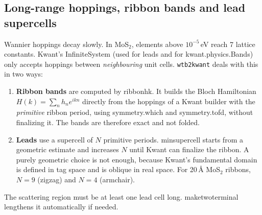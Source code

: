 \documentclass[11pt,a4paper]{article}
\newcommand{\code}[1]{{\ttfamily\def\_{\textunderscore\allowbreak}\def\slash{/\allowbreak}#1}}
\newcommand{\tool}{\texttt{wtb2kwant}}
\begin{document}
\subsection{Long-range hoppings, ribbon bands and lead supercells}
Wannier hoppings decay slowly. In MoS$_2$, elements above $10^{-5}$\,eV reach 7 lattice
constants. Kwant's \code{InfiniteSystem} (used for leads and for \code{kwant.physics.Bands})
only accepts hoppings between \emph{neighbouring} unit cells. \tool{} deals with this in
two ways:
\begin{enumerate}[nosep]
  \item \textbf{Ribbon bands} are computed by \code{ribbon\_hk}. It builds the Bloch
        Hamiltonian $H(k)=\sum_n h_n e^{ikn}$ directly from the hoppings of a Kwant builder
        with the \emph{primitive} ribbon period, using \code{symmetry.which} and
        \code{symmetry.to\_fd}, without finalizing it. The bands are therefore exact and
        not folded.
  \item \textbf{Leads} use a supercell of $N$ primitive periods. \code{min\_supercell}
        starts from a geometric estimate and increases $N$ until Kwant can finalize the
        ribbon. A purely geometric choice is not enough, because Kwant's fundamental domain
        is defined in tag space and is oblique in real space. For 20\,\AA{} MoS$_2$
        ribbons, $N=9$ (zigzag) and $N=4$ (armchair).
\end{enumerate}
The scattering region must be at least one lead cell long. \code{make\_two\_terminal}
lengthens it automatically if needed.
\end{document}
